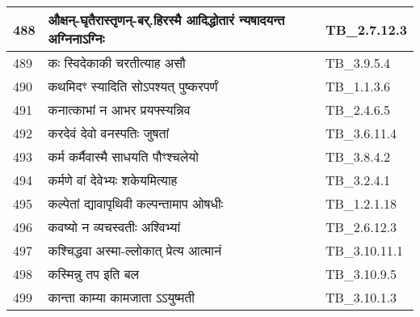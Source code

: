 \documentclass[17pt]{extarticle}
\begin{document}
\begin{longtable}{||p{0.4in}||p{4.9in}||p{0.9in}||}
    \hline
        
    488 & औक्षन्{-}घृतैरास्तृणन्{-}बर्.हिरस्मै आदिद्धोतारं न्यषादयन्त अग्निनाऽग्निः & TB\_2.7.12.3       \\
    
    \hline
        
    489 & कः स्विदेकाकी चरतीत्याह असौ & TB\_3.9.5.4       \\
    
    \hline
        
    490 & कथमिदꣳ स्यादिति सोऽपश्यत् पुष्करपर्णं & TB\_1.1.3.6       \\
    
    \hline
        
    491 & कनात्काभां न आभर प्रयफ्स्यन्निव & TB\_2.4.6.5       \\
    
    \hline
        
    492 & करदेवं देवो वनस्पतिः जुषतां & TB\_3.6.11.4       \\
    
    \hline
        
    493 & कर्म कर्मैवास्मै साधयति पौꣳश्चलेयो & TB\_3.8.4.2       \\
    
    \hline
        
    494 & कर्मणे वां देवेभ्यः शकेयमित्याह & TB\_3.2.4.1       \\
    
    \hline
        
    495 & कल्पेतां द्यावापृथिवी कल्पन्तामाप ओषधीः & TB\_1.2.1.18       \\
    
    \hline
        
    496 & कवष्यो न व्यचस्वतीः अश्विभ्यां & TB\_2.6.12.3       \\
    
    \hline
        
    497 & कश्चिद्धवा अस्मा{-}ल्लोकात् प्रेत्य आत्मानं & TB\_3.10.11.1       \\
    
    \hline
        
    498 & कस्मिन्नु तप इति बल & TB\_3.10.9.5       \\
    
    \hline
        
    499 & कान्ता काम्या कामजाता ऽऽयुष्मती & TB\_3.10.1.3       \\
    
    \hline
        

\end{longtable}
\end{document}
